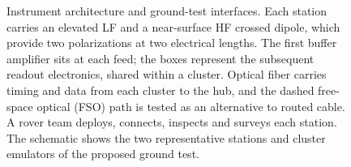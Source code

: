 \begin{figure}[t]
  \caption{Instrument architecture and ground-test interfaces. Each station carries an elevated LF and a near-surface HF crossed dipole, which provide two polarizations at two electrical lengths. The first buffer amplifier sits at each feed; the boxes represent the subsequent readout electronics, shared within a cluster. Optical fiber carries timing and data from each cluster to the hub, and the dashed free-space optical (FSO) path is tested as an alternative to routed cable. A rover team deploys, connects, inspects and surveys each station. The schematic shows the two representative stations and cluster emulators of the proposed ground test.}
  \label{fig:architecture}
\end{figure}
